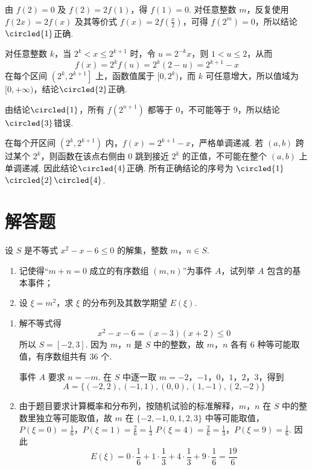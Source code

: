 \begin{solution}
由 \(f(2)=0\) 及 \(f(2)=2f(1)\)，得 \(f(1)=0\). 对任意整数 \(m\)，反复使用 \(f(2x)=2f(x)\) 及其等价式 \(f(x)=2f(\frac{x}{2})\)，可得 \(f(2^{m})=0\)，所以结论\(\circled{1}\)正确.

对任意整数 \(k\)，当 \(2^{k}<x\leqslant2^{k+1}\) 时，令 \(u=2^{-k}x\)，则 \(1<u\leqslant2\)，从而
\[
f(x)=2^{k}f(u)=2^{k}(2-u)=2^{k+1}-x
\]
在每个区间 \(\left(2^{k},2^{k+1}\right]\) 上，函数值属于 \([0,2^{k})\)，而 \(k\) 可任意增大，所以值域为 \([0,+\infty)\)，结论\(\circled{2}\)正确.

由结论\(\circled{1}\)，所有 \(f(2^{n+1})\) 都等于 \(0\)，不可能等于 \(9\)，所以结论\(\circled{3}\)错误.

在每个开区间 \(\left(2^{k},2^{k+1}\right)\) 内，\(f(x)=2^{k+1}-x\)，严格单调递减. 若 \((a,b)\) 跨过某个 \(2^{k}\)，则函数在该点右侧由 \(0\) 跳到接近 \(2^{k}\) 的正值，不可能在整个 \((a,b)\) 上单调递减. 因此结论\(\circled{4}\)正确. 所有正确结论的序号为 \(\circled{1}\)\(\circled{2}\)\(\circled{4}\).
\end{solution}

\section{解答题}

\begin{problem}
设 \(S\) 是不等式 \(x^{2} - x - 6 \leqslant 0\) 的解集，整数 \(m\)，\(n \in S\).
\begin{enumerate}
\item 记使得“\(m + n = 0\) 成立的有序数组 \((m, n)\)”为事件 \(A\)，试列举 \(A\) 包含的基本事件；
\item 设 \(\xi = m^2\)，求 \(\xi\) 的分布列及其数学期望 \(E(\xi)\).
\end{enumerate}
\end{problem}

\begin{solution}
\begin{enumerate}
\item 解不等式得
\[
x^{2}-x-6=(x-3)(x+2)\leqslant0
\]
所以 \(S=[-2,3]\). 因为 \(m\)，\(n\) 是 \(S\) 中的整数，故 \(m\)，\(n\) 各有 \(6\) 种等可能取值，有序数组共有 \(36\) 个.

事件 \(A\) 要求 \(n=-m\). 在 \(S\) 中逐一取 \(m=-2\)，\(-1\)，\(0\)，\(1\)，\(2\)，\(3\)，得到
\[
A=\{(-2,2),(-1,1),(0,0),(1,-1),(2,-2)\}
\]

\item 由于题目要求计算概率和分布列，按随机试验的标准解释，\(m\)，\(n\) 在 \(S\) 中的整数里独立等可能取值，故 \(m\) 在 \(\{-2,-1,0,1,2,3\}\) 中等可能取值，
\(P(\xi=0)=\frac16\)，\(P(\xi=1)=\frac26=\frac13\)
\(P(\xi=4)=\frac26=\frac13\)，\(P(\xi=9)=\frac16\).
因此
\[
E(\xi)=0\cdot\frac16+1\cdot\frac13+4\cdot\frac13+9\cdot\frac16=\frac{19}{6}
\]
\end{enumerate}
\end{solution}

